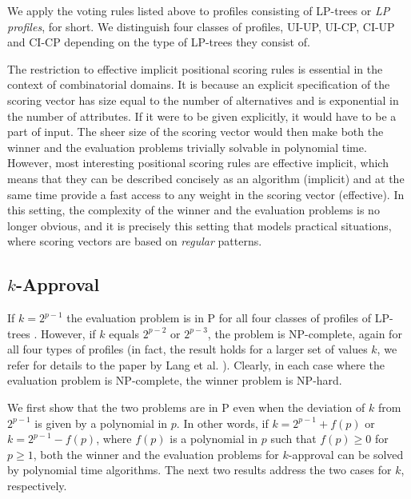 We apply the voting rules listed above to profiles consisting of LP-trees or
\emph{LP profiles}, for short. We distinguish four classes of profiles,
UI-UP, UI-CP, CI-UP and CI-CP depending on the type of LP-trees they
consist of. 

\begin{remark}
The restriction to effective implicit positional scoring rules is 
essential in the context of combinatorial domains. It is because an 
explicit specification of the scoring vector has size equal to the 
number of alternatives and is exponential in the number of attributes. If 
it were to be given explicitly, it would have to be a part of input. 
The sheer size of the scoring vector would then make both the winner 
and the evaluation problems trivially solvable in polynomial time. 
However, most interesting positional scoring rules are effective 
implicit, which means that they can be described concisely as an 
algorithm (implicit) and at the same time provide a fast access to 
any weight in the scoring vector (effective). In this setting, the 
complexity of the winner and the evaluation problems is no longer 
obvious, and it is precisely this setting that models practical
situations, where scoring vectors are based on \emph{regular}
patterns.
\end{remark}


\subsection{$k$-Approval}
If $k=2^{p-1}$ the evaluation problem is in P for all four classes of 
profiles of LP-trees \cite{lang:aggLP}. However, if $k$ equals $2^{p-2}$
or $2^{p-3}$, the problem is NP-complete, again for all four types of 
profiles \cite{lang:aggLP} (in fact, the result holds for a larger set 
of values $k$, we refer for details to the paper by Lang et al. 
\cite{lang:aggLP}). Clearly, in each case where the evaluation problem 
is NP-complete, the winner problem is NP-hard.

We first show that the two problems are in P even when the deviation of
$k$ from $2^{p-1}$ is given by a polynomial in $p$. In other words, 
if $k=2^{p-1} + f(p)$ or $k=2^{p-1} - f(p)$, where $f(p)$ is a polynomial 
in $p$ such that $f(p)\geq 0$ for $p\geq 1$, both the winner and the 
evaluation problems for $k$-approval can be solved by polynomial time 
algorithms. The next two results address the two cases for $k$,
respectively.

